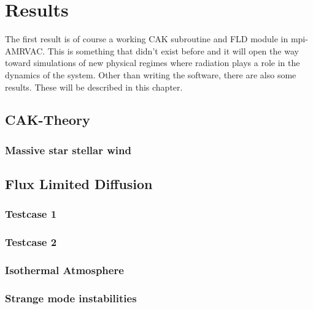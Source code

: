\chapter{Results}
The first result is of course a working CAK subroutine and FLD module in mpi-AMRVAC. This is something that didn't exist before and it will open the way toward simulations of new physical regimes where radiation plays a role in the dynamics of the system. Other than writing the software, there are also some results. These will be described in this chapter.

\section{CAK-Theory}
\subsection{Massive star stellar wind}

\section{Flux Limited Diffusion}
\subsection{Testcase 1}
\subsection{Testcase 2}
\subsection{Isothermal Atmosphere}
\subsection{Strange mode instabilities}
